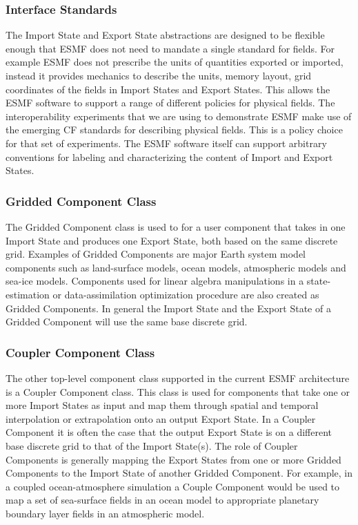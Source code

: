 \subsubsection{Interface Standards}
The Import State and Export State abstractions are designed to be flexible enough
that ESMF does not need to mandate a single standard for fields. For example ESMF does not prescribe the units
of quantities exported or imported, instead it provides mechanics to describe the units, memory layout, grid coordinates 
of the fields in Import States and Export States.  This allows the ESMF software to support a range of different policies for
physical fields. The interoperability experiments that we are using to demonstrate ESMF make use of the emerging
CF standards \cite{ref:CF} for describing physical fields. This is a policy choice for that set of experiments. The ESMF 
software itself can support arbitrary conventions for labeling and characterizing the content of Import and 
Export States.

\subsubsection{Gridded Component Class}
The Gridded Component class is used to for a user component that takes in one Import State and produces one
Export State, both based on the same discrete grid. Examples of Gridded Components are major Earth system 
model components such as land-surface models, ocean models, atmospheric models and sea-ice models. Components 
used for linear algebra manipulations in a state-estimation or data-assimilation optimization procedure are also 
created as Gridded Components. In general the Import State and the Export State of a Gridded Component will 
use the same base discrete grid.

\subsubsection{Coupler Component Class}
The other top-level component class supported in the current ESMF architecture is a Coupler Component class.
This class is used for components that take one or more Import States as input and map them through
spatial and temporal interpolation or extrapolation onto an output Export State. In a Coupler Component
it is often the case that the output Export State is on a different base discrete grid to that of
the Import State(s). The role of Coupler Components is generally mapping the Export States from one or
more Gridded Components to the Import State of another Gridded Component. For example, in a coupled
ocean-atmosphere simulation a Couple Component would be used to map a set of sea-surface fields 
in an ocean model to appropriate planetary boundary layer fields in an atmospheric model.
